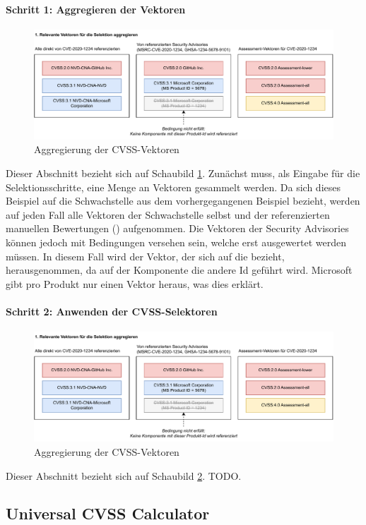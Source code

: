 \paragraph{Schritt 1: Aggregieren der Vektoren} \label{par:projektbericht-loesungsweg-cvss-selection-example-step-1}

\begin{figure}[htbp] %
    \centering
    \includegraphics[width=1\textwidth, keepaspectratio]{res/grafiken/cvss-selection-process-selection-1}
    \caption{Aggregierung der CVSS-Vektoren}
    \label{fig:cvss-selection-process-selection-1}
\end{figure}

Dieser Abschnitt bezieht sich auf Schaubild \ref{fig:cvss-selection-process-selection-1}.
Zunächst muss, als Eingabe für die Selektionsschritte, eine Menge an Vektoren gesammelt werden.
Da sich dieses Beispiel auf die Schwachstelle  aus dem vorhergegangenen Beispiel bezieht, werden auf jeden Fall alle Vektoren der Schwachstelle selbst und der referenzierten manuellen Bewertungen () aufgenommen.
Die Vektoren der Security Advisories können jedoch mit Bedingungen versehen sein, welche erst ausgewertet werden müssen.
In diesem Fall wird der Vektor, der sich auf die  bezieht, herausgenommen, da auf der Komponente die andere Id  geführt wird.
Microsoft gibt pro Produkt nur einen Vektor heraus, was dies erklärt.

\paragraph{Schritt 2: Anwenden der CVSS-Selektoren} \label{par:projektbericht-loesungsweg-cvss-selection-example-step-2}

\begin{figure}[htbp] %
    \centering
    \includegraphics[width=1\textwidth, keepaspectratio]{res/grafiken/cvss-selection-process-selection-1}
    \caption{Aggregierung der CVSS-Vektoren}
    \label{fig:cvss-selection-process-selection-2}
\end{figure}

Dieser Abschnitt bezieht sich auf Schaubild \ref{fig:cvss-selection-process-selection-2}.
TODO.

\subsection{Universal CVSS Calculator} \label{subsec:projektbericht-loesungsweg-typescript-cvss-online-calculator}
